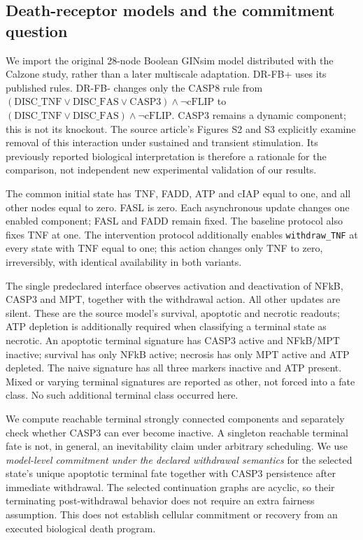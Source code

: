 \subsection{Death-receptor models and the commitment question}\label{sec:death-models}

We import the original 28-node Boolean GINsim model distributed with the
Calzone study, rather than a later multiscale adaptation.\cite{Calzone2010}
DR-FB+ uses its published rules. DR-FB- changes only the CASP8 rule from
$(\mathrm{DISC\_TNF}\lor\mathrm{DISC\_FAS}\lor\mathrm{CASP3})\land
\neg\mathrm{cFLIP}$ to
$(\mathrm{DISC\_TNF}\lor\mathrm{DISC\_FAS})\land\neg\mathrm{cFLIP}$.
CASP3 remains a dynamic component; this is not its knockout.
The source article's Figures S2 and S3 explicitly examine removal of this
interaction under sustained and transient stimulation. Its previously reported
biological interpretation is therefore a rationale for the comparison, not
independent new experimental validation of our results.

The common initial state has TNF, FADD, ATP and cIAP equal to one, and all other
nodes equal to zero. FASL is zero. Each asynchronous update changes one enabled
component; FASL and FADD remain fixed. The baseline protocol also fixes TNF at
one. The intervention protocol additionally enables \texttt{withdraw\_TNF}
at every state with TNF equal to one; this action changes only TNF to zero,
irreversibly, with identical availability in both variants.

The single predeclared interface observes activation and deactivation of
NFkB, CASP3 and MPT, together with the withdrawal action. All other updates
are silent. These are the source model's survival, apoptotic and necrotic
readouts; ATP depletion is additionally required when classifying a terminal
state as necrotic. An apoptotic terminal signature has CASP3 active and
NFkB/MPT inactive; survival has only NFkB active; necrosis has only MPT active
and ATP depleted. The naive signature has all three markers inactive and ATP
present. Mixed or varying terminal signatures are reported as other, not
forced into a fate class. No such additional terminal class occurred here.

We compute reachable terminal strongly connected components and separately
check whether CASP3 can ever become inactive. A singleton reachable terminal
fate is not, in general, an inevitability claim under arbitrary scheduling.
We use \emph{model-level commitment under the declared withdrawal semantics}
for the selected state's unique apoptotic terminal fate together with
CASP3 persistence after immediate withdrawal. The selected continuation graphs
are acyclic, so their terminating post-withdrawal behavior does not require an
extra fairness assumption. This does not establish cellular commitment or
recovery from an executed biological death program.

